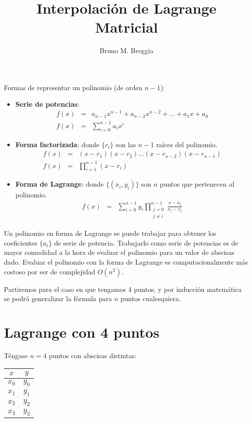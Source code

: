 \documentclass[12pt]{article}
\title{Interpolaci\'on de Lagrange Matricial}
\author{Bruno M. Breggia}
\begin{document}
\maketitle

Formas de representar un polinomio (de orden $n-1$):
\begin{itemize}
	\item \textbf{Serie de potencias}:
	\begin{eqnarray*}
	f(x) &=& a_{n-1}x^{n-1} + a_{n-2}x^{n-2} + ... + a_1 x + a_0\\
	f(x) &=& \sum\limits_{i=0}^{n-1} a_i x^i
	\end{eqnarray*}

	\item \textbf{Forma factorizada}: donde $\{r_i\}$ son las $n-1$ ra\'ices del polinomio.
	\begin{eqnarray*}
	f(x) &=& (x-r_1)(x-r_2)...(x-r_{n-2})(x-r_{n-1})\\
	f(x) &=& \prod_{i=1}^{n-1}(x-r_i)
	\end{eqnarray*}
	
	\item \textbf{Forma de Lagrange}: donde $\{(x_i,y_i)\}$ son $n$ puntos que pertenecen al polinomio.
	\begin{eqnarray*}
	f(x) &=& \sum\limits_{i=0}^{n-1} y_i \prod_{\substack{j=0 \\ j\neq i}}^{n-1} \frac{x-x_j}{x_i-x_j}
	\end{eqnarray*}
\end{itemize}

Un polinomio en forma de Lagrange se puede trabajar para obtener los coeficientes $\{a_i\}$ de serie de potencia. Trabajarlo como serie de potencias es de mayor comodidad a la hora de evaluar el polinomio para un valor de abscisas dado. Evaluar el polinomio con la forma de Lagrange es computacionalmente m\'as costoso por ser de complejidad $O(n^2)$.

Partiremos para el caso en que tengamos 4 puntos, y por inducci\'on matem\'atica se podr\'a generalizar la f\'ormula para $n$ puntos cualesquiera.

\section*{Lagrange con 4 puntos}

T\'engase $n=4$ puntos con abscisas distintas:

\begin{center}
	\begin{tabular}{c|c}
		$x$ & $y$ \\
		\hline
		$x_0$ & $y_0$ \\
		$x_1$ & $y_1$ \\
		$x_2$ & $y_2$ \\
		$x_3$ & $y_3$
	\end{tabular}
\end{center}
\end{document}
